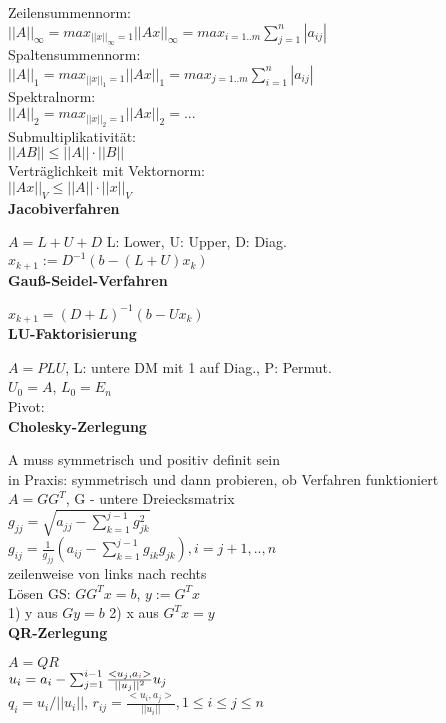 \documentclass[10pt,twocolumn,a4paper]{article}
\begin{document}
\begin{flushleft}
Zeilensummennorm:\\
$||A||_\infty = max_{||x||_\infty=1}||Ax||_\infty=max_{i=1..m}\sum_{j=1}^n |a_{ij}|$\\
Spaltensummennorm:\\
$||A||_1 = max_{||x||_1=1}||Ax||_1=max_{j=1..m}\sum_{i=1}^n |a_{ij}|$\\
Spektralnorm:\\
$||A||_2 = max_{||x||_2=1}||Ax||_2=...$\\
Submultiplikativität:\\
$||AB|| \leq ||A|| \cdot ||B||$\\
Verträglichkeit mit Vektornorm:\\
$||Ax||_V \leq ||A|| \cdot ||x||_V$\\


\textbf{Jacobiverfahren}

$A = L + U + D$ L: Lower, U: Upper, D: Diag.\\
$x_{k+1} := D^{-1}(b-(L+U)x_k)$\\

\textbf{Gauß-Seidel-Verfahren}

$x_{k+1} = (D+L)^{-1} (b-Ux_k)$\\

\textbf{LU-Faktorisierung}

$A = PLU$, L: untere DM mit 1 auf Diag., P: Permut.\\
$U_0 = A$, $L_0 = E_n$\\
Pivot: \\

\textbf{Cholesky-Zerlegung}

A muss symmetrisch und positiv definit sein\\
in Praxis: symmetrisch und dann probieren, ob Verfahren funktioniert\\
$A = GG^T$, G - untere Dreiecksmatrix\\
$g_{jj} = \sqrt{a_{jj} - \sum_{k=1}^{j-1} g_{jk}^2}$\\
$g_{ij} = \frac{1}{g_{jj}} (a_{ij} - \sum_{k=1}^{j-1} g_{ik}g_{jk}), i=j+1,..,n$\\
zeilenweise von links nach rechts\\
Lösen GS: $GG^Tx=b$, $y:=G^Tx$\\
1) y aus $Gy=b$ 2) x aus $G^Tx=y$\\

\textbf{QR-Zerlegung}

$A = QR$\\
$u_i = a_i - \sum_{j=1}^{i-1} \frac{<u_j, a_{\textcolor{red}{i}}>}{||u_j||^2}u_j$\\
$q_i = u_i / ||u_i||$, $r_{ij} = \frac{<u_i, a_j>}{||u_i||}, 1 \leq i \leq j \leq n$\\


\end{flushleft}
\end{document}
